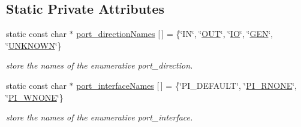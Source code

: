 \subsection*{Static Private Attributes}
\begin{DoxyCompactItemize}
\item 
static const char $\ast$ \hyperlink{structport__o_a6644ea0b57dc6845b90dd585a04c978e}{port\+\_\+direction\+Names} \mbox{[}$\,$\mbox{]} = \{\char`\"{}IN\char`\"{}, \char`\"{}\hyperlink{structport__o_adb254df5665ff28b0769491cc3899fd5ab3bfd4c2f6c68477c8c78a747e879f18}{O\+UT}\char`\"{}, \char`\"{}\hyperlink{structport__o_adb254df5665ff28b0769491cc3899fd5a1a30314caccd0c640b1703a56df5712a}{IO}\char`\"{}, \char`\"{}\hyperlink{structport__o_adb254df5665ff28b0769491cc3899fd5a1269ba4a4593962d3d6f4665e2d44f9b}{G\+EN}\char`\"{}, \char`\"{}\hyperlink{structport__o_adb254df5665ff28b0769491cc3899fd5a98736d3313a3503c8c11633bef7fd192}{U\+N\+K\+N\+O\+WN}\char`\"{}\}
\begin{DoxyCompactList}\small\item\em store the names of the enumerative port\+\_\+direction. \end{DoxyCompactList}\item 
static const char $\ast$ \hyperlink{structport__o_a6ebddbc65af6ab89c189ed8bc13d8f5a}{port\+\_\+interface\+Names} \mbox{[}$\,$\mbox{]} = \{\char`\"{}P\+I\+\_\+\+D\+E\+F\+A\+U\+LT\char`\"{}, \char`\"{}\hyperlink{structport__o_a37d2e6a450aea997028478f5bfb4e1f6aa5d5b465b9d9f94890f1c55454561cec}{P\+I\+\_\+\+R\+N\+O\+NE}\char`\"{}, \char`\"{}\hyperlink{structport__o_a37d2e6a450aea997028478f5bfb4e1f6a7cd12e9159dd94f35a2917f24a6529be}{P\+I\+\_\+\+W\+N\+O\+NE}\char`\"{}\}
\begin{DoxyCompactList}\small\item\em store the names of the enumerative port\+\_\+interface. \end{DoxyCompactList}\end{DoxyCompactItemize}
